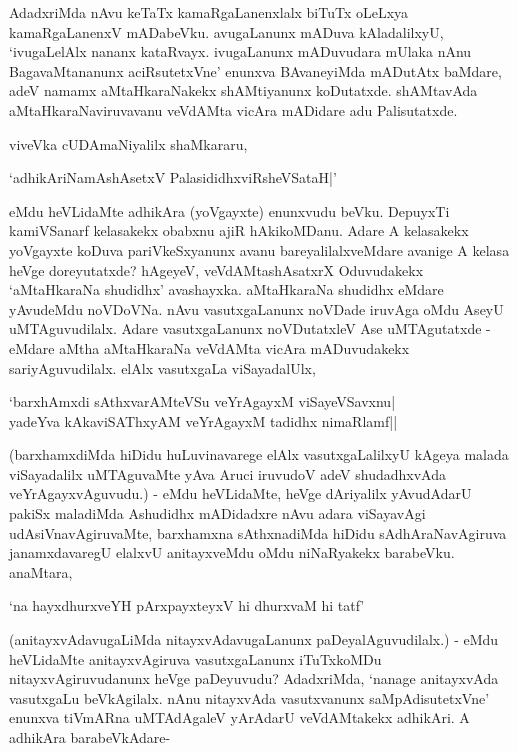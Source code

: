 AdadxriMda nAvu keTaTx kamaRgaLanenxlalx biTuTx oLeLxya kamaRgaLanenxV mADabeVku. avugaLanunx mADuva kAladalilxyU, `ivugaLelAlx nananx kataRvayx. ivugaLanunx mADuvudara mUlaka nAnu BagavaMtananunx aciRsutetxVne' enunxva BAvaneyiMda mADutAtx baMdare, adeV namamx aMtaHkaraNakekx shAMtiyanunx koDutatxde. shAMtavAda aMtaHkaraNaviruvavanu veVdAMta vicAra mADidare adu Palisutatxde.

viveVka cUDAmaNiyalilx shaMkararu,

\begin{shloka}
`adhikAriNamAshAsetxV PalasididhxviRsheVSataH|'
\end{shloka}

eMdu heVLidaMte adhikAra (yoVgayxte) enunxvudu beVku. DepuyxTi kamiVSanarf kelasakekx obabxnu ajiR hAkikoMDanu. Adare A kelasakekx yoVgayxte koDuva pariVkeSxyanunx avanu bareyalilalxveMdare avanige A kelasa heVge doreyutatxde? hAgeyeV, veVdAMtashAsatxrX Oduvudakekx `aMtaHkaraNa shudidhx' avashayxka. aMtaHkaraNa shudidhx eMdare yAvudeMdu noVDoVNa. nAvu vasutxgaLanunx noVDade iruvAga oMdu AseyU uMTAguvudilalx. Adare vasutxgaLanunx noVDutatxleV Ase uMTAgutatxde - eMdare aMtha aMtaHkaraNa veVdAMta vicAra mADuvudakekx sariyAguvudilalx. elAlx vasutxgaLa viSayadalUlx,

\begin{shloka}
`barxhAmxdi sAthxvarAMteVSu veYrAgayxM viSayeVSavxnu|\\
yadeYva kAkaviSAThxyAM veYrAgayxM tadidhx nimaRlamf||
\end{shloka}

(barxhamxdiMda hiDidu huLuvinavarege elAlx vasutxgaLalilxyU kAgeya malada viSayadalilx uMTAguvaMte yAva Aruci iruvudoV adeV shudadhxvAda veYrAgayxvAguvudu.) - eMdu heVLidaMte, heVge dAriyalilx yAvudAdarU pakiSx maladiMda Ashudidhx mADidadxre nAvu adara viSayavAgi udAsiVnavAgiruvaMte, barxhamxna sAthxnadiMda hiDidu sAdhAraNavAgiruva janamxdavaregU elalxvU anitayxveMdu oMdu niNaRyakekx barabeVku. anaMtara,

\begin{shloka}
`na hayxdhurxveYH pArxpayxteyxV hi dhurxvaM hi tatf'
\end{shloka}

(anitayxvAdavugaLiMda nitayxvAdavugaLanunx paDeyalAguvudilalx.) - eMdu heVLidaMte anitayxvAgiruva vasutxgaLanunx iTuTxkoMDu nitayxvAgiruvudanunx heVge paDeyuvudu? AdadxriMda, `nanage anitayxvAda vasutxgaLu beVkAgilalx. nAnu nitayxvAda vasutxvanunx saMpAdisutetxVne' enunxva tiVmARna uMTAdAgaleV yArAdarU veVdAMtakekx adhikAri. A adhikAra barabeVkAdare-


